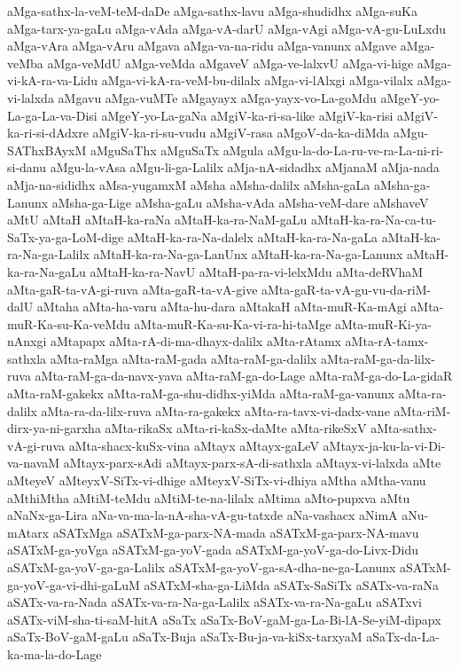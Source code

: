 {aMga-sathx-la-veM-teM-daDe
aMga-sathx-lavu
aMga-shudidhx
aMga-suKa
aMga-tarx-ya-gaLu
aMga-vAda
aMga-vA-darU
aMga-vAgi
aMga-vA-gu-LuLxdu
aMga-vAra
aMga-vAru
aMgava
aMga-va-na-ridu
aMga-vanunx
aMgave
aMga-veMba
aMga-veMdU
aMga-veMda
aMgaveV
aMga-ve-lalxvU
aMga-vi-hige
aMga-vi-kA-ra-va-Lidu
aMga-vi-kA-ra-veM-bu-dilalx
aMga-vi-lAlxgi
aMga-vilalx
aMga-vi-lalxda
aMgavu
aMga-vuMTe
aMgayayx
aMga-yayx-vo-La-goMdu
aMgeY-yo-La-ga-La-va-Disi
aMgeY-yo-La-gaNa
aMgiV-ka-ri-sa-like
aMgiV-ka-risi
aMgiV-ka-ri-si-dAdxre
aMgiV-ka-ri-su-vudu
aMgiV-rasa
aMgoV-da-ka-diMda
aMgu-SAThxBAyxM
aMguSaThx
aMguSaTx
aMgula
aMgu-la-do-La-ru-ve-ra-La-ni-ri-si-danu
aMgu-la-vAsa
aMgu-li-ga-Lalilx
aMja-nA-sidadhx
aMjanaM
aMja-nada
aMja-na-sididhx
aMsa-yugamxM
aMsha
aMsha-dalilx
aMsha-gaLa
aMsha-ga-Lanunx
aMsha-ga-Lige
aMsha-gaLu
aMsha-vAda
aMsha-veM-dare
aMshaveV
aMtU
aMtaH
aMtaH-ka-raNa
aMtaH-ka-ra-NaM-gaLu
aMtaH-ka-ra-Na-ca-tu-SaTx-ya-ga-LoM-dige
aMtaH-ka-ra-Na-dalelx
aMtaH-ka-ra-Na-gaLa
aMtaH-ka-ra-Na-ga-Lalilx
aMtaH-ka-ra-Na-ga-LanUnx
aMtaH-ka-ra-Na-ga-Lanunx
aMtaH-ka-ra-Na-gaLu
aMtaH-ka-ra-NavU
aMtaH-pa-ra-vi-lelxMdu
aMta-deRVhaM
aMta-gaR-ta-vA-gi-ruva
aMta-gaR-ta-vA-give
aMta-gaR-ta-vA-gu-vu-da-riM-dalU
aMtaha
aMta-ha-varu
aMta-hu-dara
aMtakaH
aMta-muR-Ka-mAgi
aMta-muR-Ka-su-Ka-veMdu
aMta-muR-Ka-su-Ka-vi-ra-hi-taMge
aMta-muR-Ki-ya-nAnxgi
aMtapapx
aMta-rA-di-ma-dhayx-dalilx
aMta-rAtamx
aMta-rA-tamx-sathxla
aMta-raMga
aMta-raM-gada
aMta-raM-ga-dalilx
aMta-raM-ga-da-lilx-ruva
aMta-raM-ga-da-navx-yava
aMta-raM-ga-do-Lage
aMta-raM-ga-do-La-gidaR
aMta-raM-gakekx
aMta-raM-ga-shu-didhx-yiMda
aMta-raM-ga-vanunx
aMta-ra-dalilx
aMta-ra-da-lilx-ruva
aMta-ra-gakekx
aMta-ra-tavx-vi-dadx-vane
aMta-riM-dirx-ya-ni-garxha
aMta-rikaSx
aMta-ri-kaSx-daMte
aMta-rikeSxV
aMta-sathx-vA-gi-ruva
aMta-shacx-kuSx-vina
aMtayx
aMtayx-gaLeV
aMtayx-ja-ku-la-vi-Di-va-navaM
aMtayx-parx-sAdi
aMtayx-parx-sA-di-sathxla
aMtayx-vi-lalxda
aMte
aMteyeV
aMteyxV-SiTx-vi-dhige
aMteyxV-SiTx-vi-dhiya
aMtha
aMtha-vanu
aMthiMtha
aMtiM-teMdu
aMtiM-te-na-lilalx
aMtima
aMto-pupxva
aMtu
aNaNx-ga-Lira
aNa-va-ma-la-nA-sha-vA-gu-tatxde
aNa-vashacx
aNimA
aNu-mAtarx
aSATxMga
aSATxM-ga-parx-NA-mada
aSATxM-ga-parx-NA-mavu
aSATxM-ga-yoVga
aSATxM-ga-yoV-gada
aSATxM-ga-yoV-ga-do-Livx-Didu
aSATxM-ga-yoV-ga-ga-Lalilx
aSATxM-ga-yoV-ga-sA-dha-ne-ga-Lanunx
aSATxM-ga-yoV-ga-vi-dhi-gaLuM
aSATxM-sha-ga-LiMda
aSATx-SaSiTx
aSATx-va-raNa
aSATx-va-ra-Nada
aSATx-va-ra-Na-ga-Lalilx
aSATx-va-ra-Na-gaLu
aSATxvi
aSATx-viM-sha-ti-saM-hitA
aSaTx
aSaTx-BoV-gaM-ga-La-Bi-lA-Se-yiM-dipapx
aSaTx-BoV-gaM-gaLu
aSaTx-Buja
aSaTx-Bu-ja-va-kiSx-tarxyaM
aSaTx-da-La-ka-ma-la-do-Lage
}
